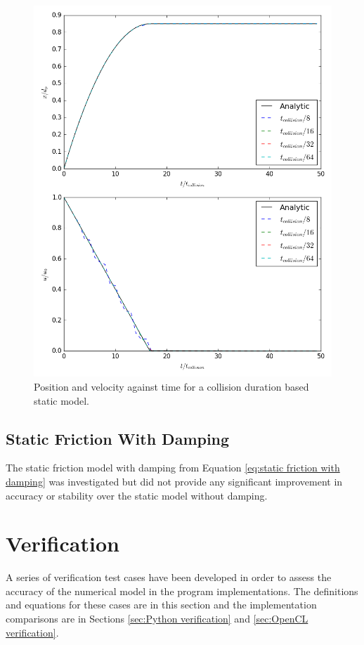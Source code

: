 \documentclass[a4paper,11pt,titlepage]{report}
\begin{document}
\begin{figure}[!ht]
\centering
\includegraphics[scale=0.5]{figures/friction_model/t_col_static.png}
\caption{Position and velocity against time for a collision duration based static model.}
\label{fig:t_col_static}
\end{figure}
\subsection{Static Friction With Damping}
The static friction model with damping from Equation \ref{eq:static friction with damping} was investigated but did not provide any significant improvement in accuracy or stability over the static model without damping.
\section{Verification}
A series of verification test cases have been developed in order to assess the accuracy of the numerical model in the program implementations. The definitions and equations for these cases are in this section and the implementation comparisons are in Sections \ref{sec:Python verification} and \ref{sec:OpenCL verification}.
\label{sec:verification}
\end{document}
